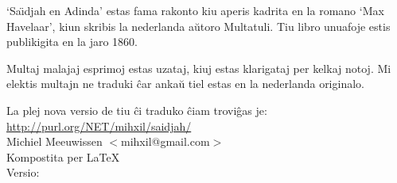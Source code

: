 \begin{minipage}[t]{\textwidth}
`Sa\"{\i}djah en Adinda' estas fama rakonto kiu aperis kadrita
en la romano `Max Havelaar', kiun skribis la nederlanda a\u{u}toro
Multatuli. Tiu libro  unuafoje estis publikigita en la jaro 1860.

Multaj malajaj esprimoj estas uzataj, kiuj estas klarigataj per
kelkaj notoj. Mi elektis multajn ne traduki \^car
anka\u{u} tiel estas en la nederlanda originalo.

La plej nova versio de tiu \^ci traduko \^ciam trovi\^gas je:\\
\href{http://purl.org/NET/mihxil/saidjah/}{http://purl.org/NET/mihxil/saidjah/}\\

Michiel  Meeuwissen $<$mihxil@gmail.com$>$\\

Kompostita per \LaTeX\\
Versio: 
\end{minipage}
